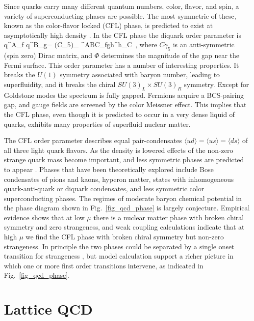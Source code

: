  Since quarks carry many different quantum numbers, color, flavor, and 
spin, a variety of superconducting phases are possible. The most symmetric 
of these, known as the color-flavor locked (CFL) phase, is predicted to 
exist at asymptotically high density \cite{Alford:1998mk,Schafer:1999fe}. 
In the CFL phase the diquark order parameter is 
\be 
\label{CFL}
\langle q^A_{\alpha f} q^B_{\beta g}\rangle = 
  (C\gamma_5)_{\alpha\beta} \epsilon^{ABC}\epsilon_{fgh}\delta^h_C\Phi \, , 
\ee
where $C\gamma_5$ is an anti-symmetric (spin zero) Dirac matrix, 
and $\Phi$ determines the magnitude of the gap near the Fermi surface. 
This order parameter has a number of interesting properties. It breaks 
the $U(1)$ symmetry associated with baryon number, leading to superfluidity, 
and it breaks the chiral $SU(3)_L \times SU(3)_R$ symmetry. Except for 
Goldstone modes the spectrum is fully gapped. Fermions acquire a BCS-pairing 
gap, and gauge fields are screened by the color Meissner effect. This 
implies that the CFL phase, even though it is predicted to occur in a
very dense liquid of quarks, exhibits many properties of superfluid 
nuclear matter.

 The CFL order parameter describes equal pair-condensates $\langle ud
\rangle =\langle us\rangle = \langle ds\rangle$  of all three light quark 
flavors. As the density is lowered effects of the non-zero strange quark 
mass become important, and less symmetric phases are predicted to appear 
\cite{Alford:2007xm}. Phases that have been theoretically explored include 
Bose condensates of pions and kaons, hyperon matter, states with inhomogeneous 
quark-anti-quark or diquark condensates, and less symmetric color 
superconducting phases. The regimes of moderate baryon chemical potential 
in the phase diagram shown in Fig.~\ref{fig_qcd_phase} is largely conjecture. 
Empirical evidence shows that at low $\mu$ there is a nuclear matter phase 
with broken chiral symmetry and zero strangeness, and weak coupling 
calculations indicate that at high $\mu$ we find the CFL phase with 
broken chiral symmetry but non-zero strangeness. In principle the two 
phases could be separated by a single onset transition for strangeness
\cite{Schafer:1998ef,Hatsuda:2006ps}, but model calculation support a 
richer picture in which one or more first order transitions intervene, 
as indicated in Fig.~\ref{fig_qcd_phase}. 

\section{Lattice QCD}
\label{sec_lqcd}

